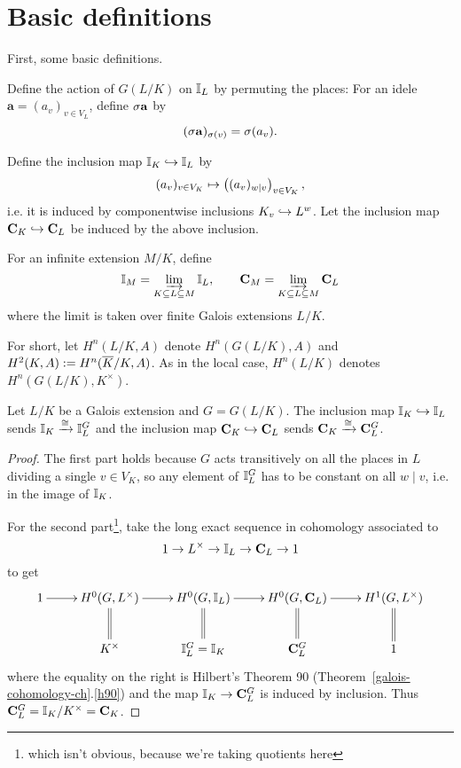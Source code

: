 \section{Basic definitions}
First, some basic definitions.
\begin{df}
Define the action of $G(L/K)$ on $\mathbb{I}_L$ by permuting the places: For an idele $\mathbf a=(a_v)_{v\in V_L}$, define $\sigma \mathbf a$ by 
\[(\sigma \mathbf a)_{\sigma(v)}=\sigma(a_v).\]
\end{df}
\begin{df}
Define the inclusion map $\mathbb{I}_K\hookrightarrow \mathbb{I}_L$ by
\[
(a_v)_{v\in V_K}\mapsto \left( {(a_v)_{w\mid v}} \right)_{v\in V_K},
\]
i.e. it is induced by componentwise inclusions $K_v\hookrightarrow L^w$. 
Let the inclusion map $\mathbf C_K\hookrightarrow \mathbf C_L$ be induced by the above inclusion.

For an infinite extension $M/K$, define 
\[
\mathbb{I}_{M}=\varinjlim_{K\subseteq L\subseteq M} \mathbb{I}_L,\qquad \mathbf C_{M}=\varinjlim_{K\subseteq L\subseteq M} \mathbf C_L
\]
where the limit is taken over finite Galois extensions $L/K$.
\end{df}
For short, let $H^n(L/K,A)$ denote $H^n(G(L/K),A)$ and $H^2(K,A):=H^n(\overline{K}/K,A)$. As in the local case, $H^n(L/K)$ denotes $H^n(G(L/K),K^{\times})$.
\begin{pr}
Let $L/K$ be a Galois extension and $G=G(L/K)$. 
The inclusion map $\mathbb{I}_K\hookrightarrow \mathbb{I}_L$ sends $\mathbb{I}_K\xrightarrow{\cong}\mathbb{I}_L^G$ and the inclusion map $\mathbf C_K\hookrightarrow \mathbf C_L$ sends $\mathbf C_K\xrightarrow{\cong} \mathbf C_L^G$.
\end{pr}
\begin{proof}
The first part holds because $G$ acts transitively on all the places in $L$ dividing a single $v\in V_K$, so any element of $\mathbb{I}_L^G$ has to be constant on all $w\mid v$, i.e. in the image of $\mathbb{I}_K$.

For the second part\footnote{which isn't obvious, because we're taking quotients here}, take the long exact sequence in cohomology associated to
\[
1\to L^{\times}\to \mathbb{I}_L\to \mathbf C_L\to 1
\]
to get
\[
\xymatrix{
1\ar[r] & H^0(G,L^{\times})\ar@{=}[d] \ar[r] & H^0(G,\I_L)\ar[r]\ar@{=}[d] & H^0(G,\mathbf C_L) \ar[r] \ar@{=}[d] & H^1(G,L^{\times})\ar@{=}[d]\\
& K^{\times} & \I_L^G=\I_K & \mathbf C_L^G & 1
}
\]
where the equality on the right is Hilbert's Theorem 90 (Theorem~\ref{galois-cohomology-ch}.\ref{h90}) and the map $\mathbb{I}_K\to \mathbf C_L^G$ is induced by inclusion. Thus $\mathbf C_L^G=\mathbb{I}_K/K^{\times}=\mathbf C_K$.
\end{proof}
